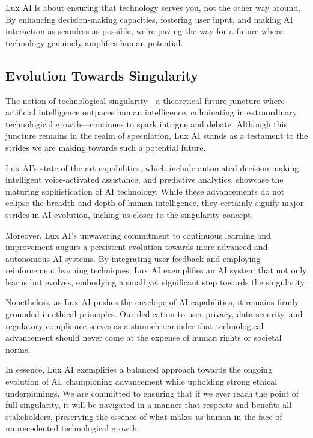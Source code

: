 \documentclass[11pt]{article}
\begin{document}
Lux AI is about ensuring that technology serves you, not the other way around. By enhancing decision-making capacities, fostering user input, and making AI interaction as seamless as possible, we're paving the way for a future where technology genuinely amplifies human potential.


\subsection{Evolution Towards Singularity}

The notion of technological singularity---a theoretical future juncture where artificial intelligence outpaces human intelligence, culminating in extraordinary technological growth---continues to spark intrigue and debate. Although this juncture remains in the realm of speculation, Lux AI stands as a testament to the strides we are making towards such a potential future.


Lux AI's state-of-the-art capabilities, which include automated decision-making, intelligent voice-activated assistance, and predictive analytics, showcase the maturing sophistication of AI technology. While these advancements do not eclipse the breadth and depth of human intelligence, they certainly signify major strides in AI evolution, inching us closer to the singularity concept.


Moreover, Lux AI's unwavering commitment to continuous learning and improvement augurs a persistent evolution towards more advanced and autonomous AI systems. By integrating user feedback and employing reinforcement learning techniques, Lux AI exemplifies an AI system that not only learns but evolves, embodying a small yet significant step towards the singularity.


Nonetheless, as Lux AI pushes the envelope of AI capabilities, it remains firmly grounded in ethical principles. Our dedication to user privacy, data security, and regulatory compliance serves as a staunch reminder that technological advancement should never come at the expense of human rights or societal norms.


In essence, Lux AI exemplifies a balanced approach towards the ongoing evolution of AI, championing advancement while upholding strong ethical underpinnings. We are committed to ensuring that if we ever reach the point of full singularity, it will be navigated in a manner that respects and benefits all stakeholders, preserving the essence of what makes us human in the face of unprecedented technological growth.
\end{document}
